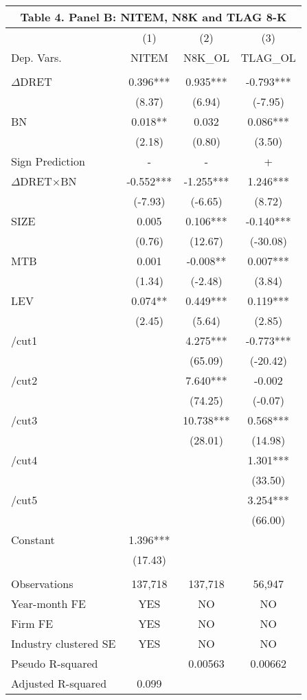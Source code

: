 \begin{table}[htbp] \label{T4PB}
  \centering
    \begin{tabular}{lccc}
    \multicolumn{4}{c}{\textbf{Table 4. Panel B: NITEM, N8K and TLAG 8-K}} \\
    \midrule
      & (1) & (2) & (3) \\
    Dep. Vars. & NITEM & N8K\_OL & TLAG\_OL \\
    \midrule
      &   &   &  \\
    $\Delta$DRET & 0.396*** & 0.935*** & -0.793*** \\
    & (8.37) & (6.94) & (-7.95) \\
    BN & 0.018** & 0.032 & 0.086*** \\
    & (2.18) & (0.80) & (3.50) \\
    \rowcolor[rgb]{ .933,  .925,  .882} Sign Prediction & - & - & + \\
    \rowcolor[rgb]{ .933,  .925,  .882} $\Delta$DRET$\times$BN & -0.552*** & -1.255*** & 1.246*** \\
    \rowcolor[rgb]{ .933,  .925,  .882}   & (-7.93) & (-6.65) & (8.72) \\
    SIZE & 0.005 & 0.106*** & -0.140*** \\
    & (0.76) & (12.67) & (-30.08) \\
    MTB & 0.001 & -0.008** & 0.007*** \\
    & (1.34) & (-2.48) & (3.84) \\
    LEV & 0.074** & 0.449*** & 0.119*** \\
    & (2.45) & (5.64) & (2.85) \\
    /cut1 &   & 4.275*** & -0.773*** \\
    &   & (65.09) & (-20.42) \\
    /cut2 &   & 7.640*** & -0.002 \\
    &   & (74.25) & (-0.07) \\
    /cut3 &   & 10.738*** & 0.568*** \\
    &   & (28.01) & (14.98) \\
    /cut4 &   &   & 1.301*** \\
    &   &   & (33.50) \\
    /cut5 &   &   & 3.254*** \\
    &   &   & (66.00) \\
    Constant & 1.396*** &   &  \\
    & (17.43) &   &  \\
    &   &   &  \\
    Observations & 137,718 & 137,718 & 56,947 \\
    Year-month FE & YES & NO & NO \\
    Firm FE & YES & NO & NO \\
    Industry clustered SE & YES & NO & NO \\
    Pseudo R-squared & & 0.00563 & 0.00662 \\
    Adjusted R-squared & 0.099 &   &  \\
    \bottomrule
    
    \end{tabular}%
\end{table}%